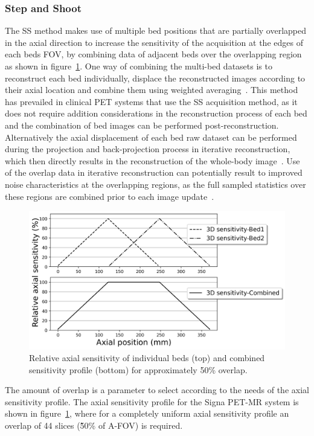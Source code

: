 \subsubsection{Step and Shoot}
The SS method makes use of multiple bed positions that are partially overlapped in the axial direction to increase the sensitivity of the acquisition at the edges of each beds FOV, by combining data of adjacent beds over the overlapping region as shown in figure~\ref{fig3_1:fullOverlap}. One way of combining the multi-bed datasets is to reconstruct each bed individually, displace the reconstructed images according to their axial location and combine them using weighted averaging~\cite{Schubert1996}. This method has prevailed in clinical PET systems that use the SS acquisition method, as it does not require addition considerations in the reconstruction process of each bed and the combination of bed images can be performed post-reconstruction. Alternatively the axial displacement of each bed raw dataset can be performed during the projection and back-projection process in iterative reconstruction, which then directly results in the reconstruction of the whole-body image~\cite{Ross2004}. Use of the overlap data in iterative reconstruction can potentially result to improved noise characteristics at the overlapping regions, as the full sampled statistics over these regions are combined prior to each image update~\cite{Ross2004,Stute2014}. 
%
\begin{figure} [ht!]
\centering
\includegraphics[scale=0.5,angle=0]{3_Results/3_1_DWB_Optimization/figures/SensitivityProfiles_fullOverlap.png}
\caption{Relative axial sensitivity of individual beds (top) and combined sensitivity profile (bottom) for approximately 50\% overlap.} 
\label{fig3_1:fullOverlap}
\end{figure}
%
The amount of overlap is a parameter to select according to the needs of the axial sensitivity profile.  The axial sensitivity profile for the Signa PET-MR system is shown in figure~\ref{fig3_1:fullOverlap}, where for a completely uniform axial sensitivity profile an overlap of 44 slices (\~50\% of A-FOV) is required.
